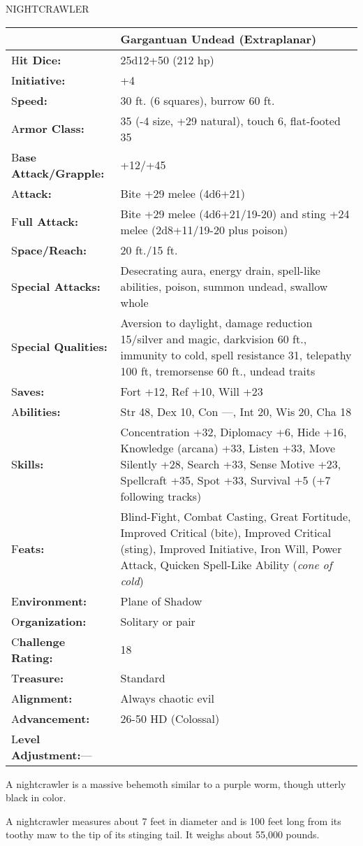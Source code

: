 \documentclass{article}
\begin{document}
\vspace{12pt}
NIGHTCRAWLER

\begin{tabular}{|>{\raggedright}p{91pt}|>{\raggedright}p{216pt}|}
\hline
  & Gargantuan Undead (Extraplanar)\tabularnewline
\hline
H\textbf{it Dice:} & 25d12+50 (212 hp)\tabularnewline
\hline
I\textbf{nitiative:} & +4\tabularnewline
\hline
S\textbf{peed:} & 30 ft. (6 squares), burrow 60 ft.\tabularnewline
\hline
A\textbf{rmor Class:} & 35 (-4 size, +29 natural), touch 6, flat-footed 35\tabularnewline
\hline
B\textbf{ase Attack/Grapple:} & +12/+45\tabularnewline
\hline
A\textbf{ttack:} & Bite +29 melee (4d6+21)\tabularnewline
\hline
F\textbf{ull Attack:} & Bite +29 melee (4d6+21/19-20) and sting +24 melee (2d8+11/19-20 
plus poison)\tabularnewline
\hline
S\textbf{pace/Reach:} & 20 ft./15 ft.\tabularnewline
\hline
S\textbf{pecial Attacks:} & Desecrating aura, energy drain, spell-like abilities, 
poison, summon undead, swallow whole\tabularnewline
\hline
S\textbf{pecial Qualities:} & Aversion to daylight, damage reduction 15/silver 
and magic, darkvision 60 ft., immunity to cold, spell resistance 31, telepathy 
100 ft, tremorsense 60 ft., undead traits\tabularnewline
\hline
S\textbf{aves:} & Fort +12, Ref +10, Will +23\tabularnewline
\hline
A\textbf{bilities:} & Str 48, Dex 10, Con ---, Int 20, Wis 20, Cha 18\tabularnewline
\hline
S\textbf{kills:} & Concentration +32, Diplomacy +6, Hide +16, Knowledge (arcana) 
+33, Listen +33, Move Silently +28, Search +33, Sense Motive +23, Spellcraft +35, 
Spot +33, Survival +5 (+7 following tracks)\tabularnewline
\hline
F\textbf{eats:} & Blind-Fight, Combat Casting, Great Fortitude, Improved Critical 
(bite), Improved Critical (sting), Improved Initiative, Iron Will, Power Attack, 
Quicken Spell-Like Ability (\textit{cone of cold})\tabularnewline
\hline
E\textbf{nvironment:} & Plane of Shadow\tabularnewline
\hline
O\textbf{rganization:} & Solitary or pair\tabularnewline
\hline
C\textbf{hallenge Rating:} & 18\tabularnewline
\hline
T\textbf{reasure:} & Standard\tabularnewline
\hline
A\textbf{lignment:} & Always chaotic evil\tabularnewline
\hline
A\textbf{dvancement:} & 26-50 HD (Colossal)\tabularnewline
\hline
L\textbf{evel Adjustment:}--- & \tabularnewline
\hline
\end{tabular}

\vspace{12pt}
A nightcrawler is a massive behemoth similar to a purple worm, though utterly black 
in color.

A nightcrawler measures about 7 feet in diameter and is 100 feet long from its 
toothy maw to the tip of its stinging tail. It weighs about 55,000 pounds.
\end{document}
